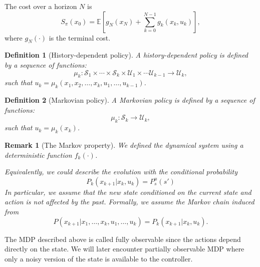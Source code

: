\documentclass[a4 paper]{article}
\numberwithin{equation}{section}
\theoremstyle{boldStyle}
\newtheorem{remark}{Remark}[section]
\theoremstyle{boldBlueStyle}
\theoremstyle{boldPurpleStyle}
\theoremstyle{boldRedStyle}
\newtheorem{definition}{Definition}[section]
\theoremstyle{boldGreenStyle}
\begin{document}
The cost over a horizon \( N \) is
\begin{equation}
  S_\pi(x_0) = \mathbb{E}[g_N(x_N) + \sum_{k=0}^{N-1} g_k(x_k, u_k)],
\end{equation}
where \( g_N(\cdot) \) is the terminal cost.

\begin{definition}[History-dependent policy]
  A history-dependent policy is defined by a sequence of functions:
  \begin{equation}
    \mu_k : \mathcal{S}_1 \times \cdots \times \mathcal{S}_k \times \mathcal{U}_1 \times \cdots \mathcal{U}_{k-1} \to \mathcal{U}_k,
  \end{equation}
  such that \( u_k = \mu_k(x_1, x_2, \ldots, x_k, u_1, \ldots, u_{k-1}) \).
\end{definition}

\begin{definition}[Markovian policy]
  A Markovian policy is defined by a sequence of functions:
  \begin{equation}
    \mu_k : \mathcal{S}_k \to \mathcal{U}_k,
  \end{equation}
  such that \( u_k = \mu_k(x_k) \).
\end{definition}

\begin{remark}[The Markov property]
  We defined the dynamical system using a deterministic function \( f_k(\cdot) \). 

  Equivalently, we could describe the evolution with the conditional probability
  \begin{equation}
    P_k(x_{k+1} | x_k, u_k) = P_s^{u}(s')
  \end{equation}
  In particular, we assume that the new state conditioned on the current state and action is not affected by the past. Formally, we assume the Markov chain induced from
  \begin{equation}
    P(x_{k+1} | x_1, \ldots, x_k, u_1, \ldots, u_k) = P_k(x_{k+1} | x_k, u_k).
  \end{equation}
\end{remark}

The MDP described above is called fully observable since the actions depend directly on the state. We will later encounter partially observable MDP where only a noisy version of the state is available to the controller.
\end{document}

